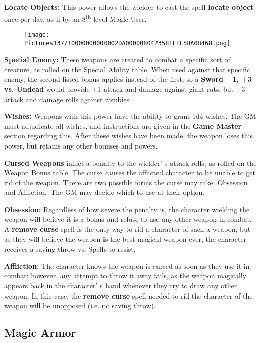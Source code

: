 \documentclass[a4paper,twoside,openany,10pt]{book}
\begin{document}
\begin{multicols}{2}
\textbf{Locate Objects:} This power allows the wielder to cast the spell \textbf{locate object} once per day, as if by an 8\textsuperscript{th} level Magic-User.

\begin{wrapfigure}{l}{0.25\textwidth}
	\texttt{[image: Pictures137/10000000000002DA0000080423581FFF58A0B468.png]}\medskip
\end{wrapfigure}

\textbf{Special Enemy:} These weapons are created to combat a specific sort of creature, as rolled on the Special Ability table. When used against that specific enemy, the second listed bonus applies instead of the first; so a \textbf{Sword +1, +3 vs. Undead} would provide +1 attack and damage against giant rats, but +3 attack and damage rolls against zombies.

\textbf{Wishes:} Weapons with this power have the ability to grant 1d4 wishes. The GM must adjudicate all wishes, and instructions are given in the \textbf{Game Master} section regarding this. After these wishes have been made, the weapon loses this power, but retains any other bonuses and powers.

\textbf{Cursed Weapons} inflict a penalty to the wielder' s attack rolls, as rolled on the Weapon Bonus table. The curse causes the afflicted character to be unable to get rid of the weapon. There are two possible forms the curse may take: Obsession and Affliction. The GM may decide which to use at their option. 

\textbf{Obsession:} Regardless of how severe the penalty is, the character wielding the weapon will believe it is a bonus and refuse to use any other weapon in combat. A \textbf{remove curse} spell is the only way to rid a character of such a weapon; but as they will believe the weapon is the best magical weapon ever, the character receives a saving throw vs. Spells to resist.

\textbf{Affliction: } The character knows the weapon is cursed as soon as they use it in combat; however, any attempt to throw it away fails, as the weapon magically appears back in the character' s hand whenever they try to draw any other weapon. In this case, the \textbf{remove curse} spell needed to rid the character of the weapon will be unopposed (i.e. no saving throw).


\subsection{Magic Armor}\label{magic-armor-1}


\end{multicols}
\end{document}
